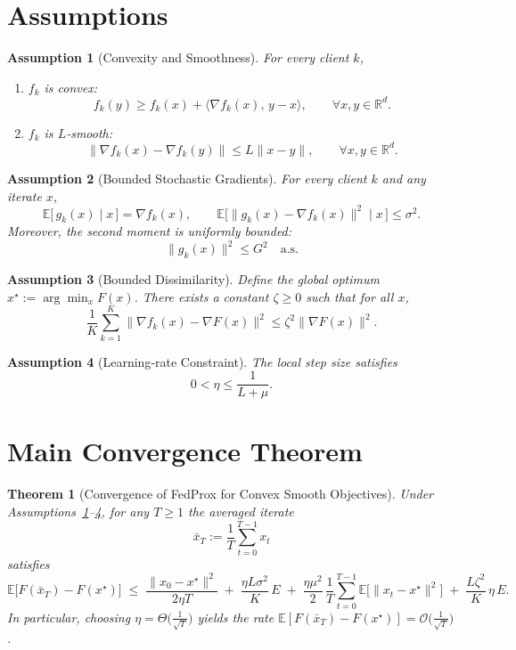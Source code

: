 \documentclass[11pt]{article}
\newtheorem{theorem}{Theorem}
\newtheorem{assumption}{Assumption}
\newcommand{\E}{\mathbb{E}}
\newcommand{\R}{\mathbb{R}}
\begin{document}
\newpage

\section*{Assumptions}
\begin{assumption}[Convexity and Smoothness]\label{ass:convex-smooth}
For every client $k$,
\begin{enumerate}[label=(\alph*)]
    \item $f_k$ is convex:
    \[
    f_k(y)\ge f_k(x)+\langle \nabla f_k(x),\,y-x\rangle,\qquad\forall x,y\in\R^d .
    \]
    \item $f_k$ is $L$‑smooth:
    \[
    \|\nabla f_k(x)-\nabla f_k(y)\|\le L\|x-y\|,\qquad\forall x,y\in\R^d .
    \]
\end{enumerate}
\end{assumption}

\begin{assumption}[Bounded Stochastic Gradients]\label{ass:bounded-grad}
For every client $k$ and any iterate $x$,
\[
\E\!\bigl[\,g_{k}(x)\mid x\,\bigr]=\nabla f_k(x),\qquad 
\E\!\bigl[\|g_{k}(x)-\nabla f_k(x)\|^2\mid x\,\bigr]\le\sigma^2 .
\]
Moreover, the second moment is uniformly bounded:
\[
\|g_{k}(x)\|^2\le G^2\quad\text{a.s.}
\]
\end{assumption}

\begin{assumption}[Bounded Dissimilarity]\label{ass:dissimilarity}
Define the global optimum $x^\star:=\arg\min_x F(x)$.  
There exists a constant $\zeta\ge0$ such that for all $x$,
\[
\frac1K\sum_{k=1}^K\|\nabla f_k(x)-\nabla F(x)\|^2\le\zeta^2\|\nabla F(x)\|^2 .
\]
\end{assumption}

\begin{assumption}[Learning‑rate Constraint]\label{ass:lr}
The local step size satisfies
\[
0<\eta\le \frac{1}{L+\mu}.
\]
\end{assumption}

\section*{Main Convergence Theorem}
\begin{theorem}[Convergence of FedProx for Convex Smooth Objectives]\label{thm:main}
Under Assumptions~\ref{ass:convex-smooth}–\ref{ass:lr}, for any $T\ge1$ the averaged iterate
\[
\bar x_T:=\frac1T\sum_{t=0}^{T-1}x_t
\]
satisfies
\[
\boxed{
\mathbb{E}\!\bigl[F(\bar x_T)-F(x^\star)\bigr]
\;\le\;
\frac{\|x_0-x^\star\|^2}{2\eta T}
\;+\;
\frac{\eta L\sigma^2}{K}\,E
\;+\;
\frac{\eta\mu^2}{2}\,\frac{1}{T}\sum_{t=0}^{T-1}\mathbb{E}\!\bigl[\|x_t-x^\star\|^2\bigr]
\;+\;
\frac{L\zeta^2}{K}\,\eta\,E .
}
\]
In particular, choosing $\eta =\Theta\!\bigl(\tfrac{1}{\sqrt{T}}\bigr)$ yields the
rate $ \mathbb{E}[F(\bar x_T)-F(x^\star)]=\mathcal{O}\!\bigl(\tfrac{1}{\sqrt{T}}\bigr)$.
\end{theorem}
\end{document}
